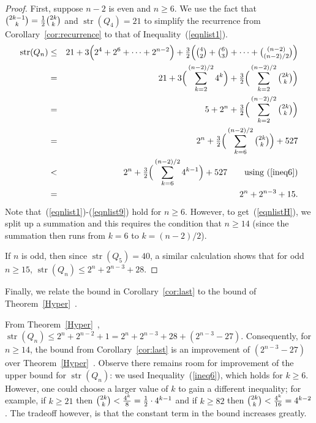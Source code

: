 \documentclass[12pt]{article}
\DeclareMathOperator{\str}{str}
\begin{document}
\begin{proof} First, suppose $n-2$ is even and $n \geq 6$.  We use the fact that $\tbinom{2k-1}{k} = \tfrac{1}{2}\tbinom{2k}{k}$ and $\str(Q_4)=21$ to simplify the recurrence from Corollary~\ref{cor:recurrence} to that of Inequality~(\ref{eqnlist1}).
\begin{eqnarray} \str(Q_{n}) 
&\leq&\label{eqnlist1} 21+ 3 \Big(2^4+2^6+\cdots+2^{n-2}\Big)+\tfrac{3}{2} \Big(\tbinom{4}{2}+\tbinom{6}{3}+\cdots+\tbinom{(n-2)}{(n-2)/2}\Big) \\ 
&=& 21+3 \Big(\sum_{k=2}^{(n-2)/2} 4^k\Big)+\tfrac{3}{2} \Big(\sum_{k=2}^{(n-2)/2} \tbinom{2k}{k}\Big)\\ 
&=&\label{eqnlist9} 5+ 2^{n} +\tfrac{3}{2} \Big(\sum_{k=2}^{(n-2)/2} \tbinom{2k}{k}\Big)\\   
&=&\label{eqnlistH} 2^{n} + \tfrac{3}{2} \Big( \sum_{k=6}^{(n-2)/2} \tbinom{2k}{k}\Big) + 527\\
&<&\nonumber 2^{n} + \tfrac{3}{2} \Big( \sum_{k=6}^{(n-2)/2} 4^{k-1}\Big) + 527 ~~~~~~ \text{using~(\ref{ineq6})}\\  
&=&\nonumber 2^{n} + 2^{n-3}+15.\end{eqnarray}  Note that~(\ref{eqnlist1})-(\ref{eqnlist9}) hold for $n \geq 6$.  However, to get~(\ref{eqnlistH}), we split up a summation and this requires the condition that $n \geq 14$ (since the summation then runs from $k=6$ to $k=(n-2)/2$).


If $n$ is odd, then since $\str(Q_5)=40$,  a similar calculation shows that for odd $n \geq 15$, $\str(Q_{n}) \leq 2^{n}+2^{n-3}+28.$\end{proof}

Finally, we relate the bound in Corollary~\ref{cor:last} to the bound of Theorem~\ref{Hyper}~\cite{I.2018}.  
 
From Theorem~\ref{Hyper}~\cite{I.2018}, $\str(Q_n) \leq 2^n+2^{n-2}+1 = 2^n+2^{n-3}+28 +(2^{n-3}-27).$  Consequently, for $n \geq 14$, the bound from Corollary~\ref{cor:last} is an improvement of $(2^{n-3}-27)$ over Theorem~\ref{Hyper}~\cite{I.2018}.  Observe there remains room for improvement of the upper bound for $\str(Q_n)$: we used Inequality~(\ref{ineq6}), which holds for $k \geq 6$.  However, one could choose a larger value of $k$ to gain a different inequality; for example, if $k \geq 21$ then $\tbinom{2k}{k} < \frac{4^k}{8} = \frac{1}{2} \cdot 4^{k-1}$ and if $k \geq 82$ then $\tbinom{2k}{k} < \frac{4^k}{16} = 4^{k-2}$.  The tradeoff however, is that the constant term in the bound increases greatly. 
\end{document}
